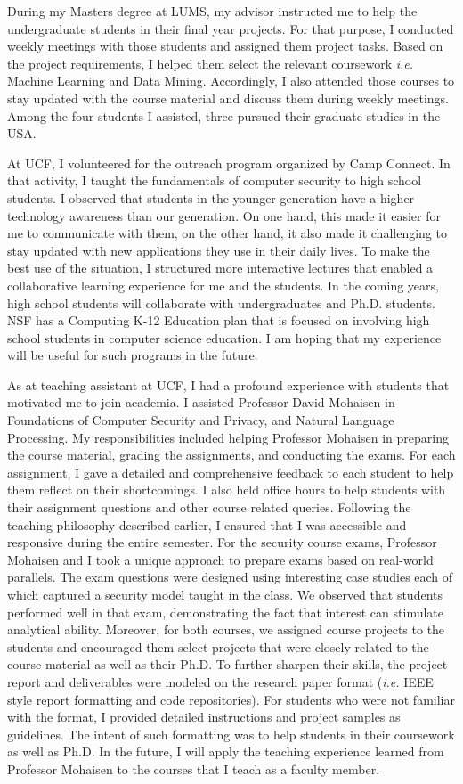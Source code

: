 \documentclass{NSF}
\newcommand{\ie}{{\em i.e.}\xspace}
\begin{document}
During my Masters degree at LUMS, my advisor instructed me to help the undergraduate students in their final year projects. For that purpose, I conducted weekly meetings with those students and assigned them project tasks. Based on the project requirements, I helped them select the relevant coursework \ie Machine Learning and Data Mining. Accordingly, I also attended those courses to stay updated with the course material and discuss them during weekly meetings. Among the four students I assisted, three pursued their graduate studies in the USA.

At UCF, I volunteered for the outreach program organized by Camp Connect. In that activity, I taught the fundamentals of computer security to high school students. I observed that students in the younger generation have a higher technology awareness than our generation. On one hand, this made it easier for me to communicate with them, on the other hand, it also made it challenging to stay updated with new applications they use in their daily lives. To make the best use of the situation, I structured more interactive lectures that enabled a collaborative learning experience for me and the students. In the coming years, high school students will collaborate with undergraduates and Ph.D. students. NSF has a Computing K-12 Education plan that is focused on involving high school students in computer science education. I am hoping that my experience will be useful for such programs in the future. 


As at teaching assistant at UCF, I had a profound experience with students that motivated me to join academia. I assisted Professor David Mohaisen in Foundations of Computer Security and Privacy, and Natural Language Processing. My responsibilities included helping Professor Mohaisen in preparing the course material, grading the assignments, and conducting the exams. For each assignment, I gave a detailed and comprehensive feedback to each student to help them reflect on their shortcomings. I also held office hours to help students with their assignment questions and other course related queries. Following the teaching philosophy described earlier, I ensured that I was accessible and responsive during the entire semester. For the security course exams, Professor Mohaisen and I took a unique approach to prepare exams based on real-world parallels. The exam questions were designed using interesting case studies each of which captured a security model taught in the class. We observed that students performed well in that exam, demonstrating the fact that interest can stimulate analytical ability. Moreover, for both courses, we assigned course projects to the students and encouraged them select projects that were closely related to the course material as well as their Ph.D. To further sharpen their skills, the project report and deliverables were modeled on the research paper format (\ie IEEE style report formatting and code repositories). For students who were not familiar with the format, I provided detailed instructions and project samples as guidelines. The intent of such formatting was to help students in their coursework as well as Ph.D. In the future, I will apply the teaching experience learned from Professor Mohaisen to the courses that I teach as a faculty member. 
\end{document}
